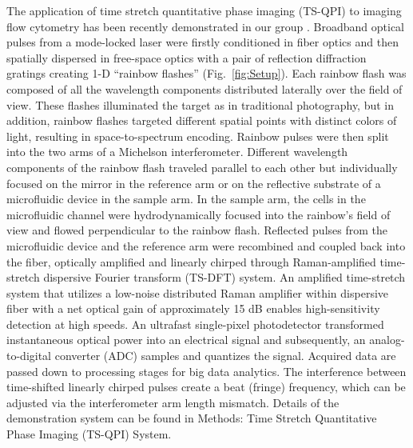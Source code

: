\documentclass[aps,pra,reprint,superscriptaddress]{revtex4-1}
\begin{document}
The application of time stretch quantitative phase imaging (TS-QPI) to imaging flow cytometry has been recently demonstrated in our group \cite{mahjoubfar2013label}. Broadband optical pulses from a mode-locked laser were firstly conditioned in fiber optics and then spatially dispersed in free-space optics with a pair of reflection diffraction gratings creating 1-D ``rainbow flashes'' (Fig.~\ref{fig:Setup}). Each rainbow flash was composed of all the wavelength components distributed laterally over the field of view. These flashes illuminated the target as in traditional photography, but in addition, rainbow flashes targeted different spatial points with distinct colors of light, resulting in space-to-spectrum encoding. Rainbow pulses were then split into the two arms of a Michelson interferometer. Different wavelength components of the rainbow flash traveled parallel to each other but individually focused on the mirror in the reference arm or on the reflective substrate of a microfluidic device in the sample arm. In the sample arm, the cells in the microfluidic channel were hydrodynamically focused \cite{knight1998hydrodynamic,lee2006hydrodynamic} into the rainbow's field of view and flowed perpendicular to the rainbow flash. Reflected pulses from the microfluidic device and the reference arm were recombined and coupled back into the fiber, optically amplified and linearly chirped through Raman-amplified time-stretch dispersive Fourier transform (TS-DFT) system. An amplified time-stretch system that utilizes a low-noise distributed Raman amplifier within dispersive fiber with a net optical gain of approximately 15 dB enables high-sensitivity detection at high speeds. An ultrafast single-pixel photodetector transformed instantaneous optical power into an electrical signal and subsequently, an analog-to-digital converter (ADC) samples and quantizes the signal. Acquired data are passed down to processing stages for big data analytics. The interference between time-shifted linearly chirped pulses create a beat (fringe) frequency, which can be adjusted via the interferometer arm length mismatch. Details of the demonstration system can be found in Methods: Time Stretch Quantitative Phase Imaging (TS-QPI) System.
\end{document}
